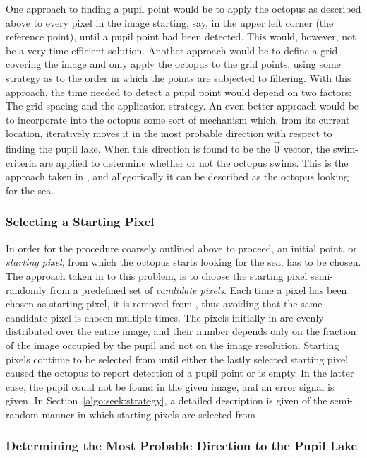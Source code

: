 One approach to finding a pupil point would be to apply the octopus as
described above to every pixel in the image starting, say, in the
upper left corner (the reference point), until a pupil point had been
detected.  This would, however, not be a very time-efficient solution.
Another approach would be to define a grid covering the image and only
apply the octopus to the grid points, using some strategy as to the
order in which the points are subjected to filtering.  With this
approach, the time needed to detect a pupil point would depend on two
factors: The grid spacing and the application strategy.  An even
better approach would be to incorporate into the octopus some sort of
mechanism which, from its current location, iteratively moves it in
the most probable direction with respect to finding the pupil lake.
When this direction is found to be the $\vec{0}$ vector, the
swim-criteria are applied to determine whether or not the octopus
swims.  This is the approach taken in {\octopus}, and allegorically it
can be described as the octopus looking for the sea.

\subsubsection{Selecting a Starting Pixel}

In order for the procedure coarsely outlined above to proceed, an
initial point, or {\em starting pixel\/}, from which the octopus
starts looking for the sea, has to be chosen.  The approach taken in
{\octopus} to this problem, is to choose the starting pixel
semi-randomly from a predefined set {\SS} of {\em candidate pixels\/}.
Each time a pixel has been chosen as starting pixel, it is removed
from {\SS}, thus avoiding that the same candidate pixel is chosen
multiple times.  The pixels initially in {\SS} are evenly distributed
over the entire image, and their number depends only on the fraction
of the image occupied by the pupil and not on the image resolution.
Starting pixels continue to be selected from {\SS} until either the
lastly selected starting pixel caused the octopus to report detection
of a pupil point or {\SS} is empty.  In the latter case, the pupil
could not be found in the given image, and an error signal is given.
In Section~\ref{algo:seek:strategy}, a detailed description is given
of the semi-random manner in which starting pixels are selected from
{\SS}.

\subsubsection{Determining the Most Probable Direction to the
  Pupil Lake}

